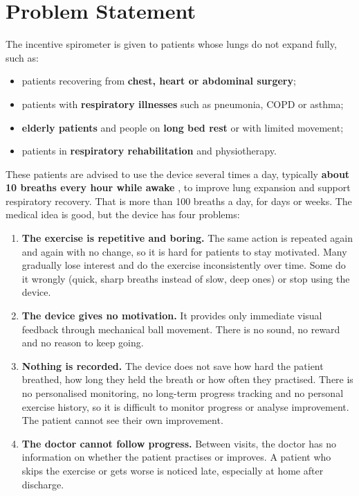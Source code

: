 \documentclass[12pt,a4paper]{article}
\begin{document}
\section{Problem Statement}
\label{sec:problem}

The incentive spirometer is given to patients whose lungs do not expand fully, such as:
\begin{itemize}
  \item patients recovering from \textbf{chest, heart or abdominal surgery};
  \item patients with \textbf{respiratory illnesses} such as pneumonia, COPD or asthma;
  \item \textbf{elderly patients} and people on \textbf{long bed rest} or with limited movement;
  \item patients in \textbf{respiratory rehabilitation} and physiotherapy.
\end{itemize}
These patients are advised to use the device several times a day, typically \textbf{about 10 breaths every hour while awake} \cite{cleveland}, to improve lung expansion and support respiratory recovery. That is more than 100 breaths a day, for days or weeks. The medical idea is good, but the device has four problems:

\begin{enumerate}
  \item \textbf{The exercise is repetitive and boring.} The same action is repeated again and again with no change, so it is hard for patients to stay motivated. Many gradually lose interest and do the exercise inconsistently over time. Some do it wrongly (quick, sharp breaths instead of slow, deep ones) or stop using the device.
  \item \textbf{The device gives no motivation.} It provides only immediate visual feedback through mechanical ball movement. There is no sound, no reward and no reason to keep going.
  \item \textbf{Nothing is recorded.} The device does not save how hard the patient breathed, how long they held the breath or how often they practised. There is no personalised monitoring, no long-term progress tracking and no personal exercise history, so it is difficult to monitor progress or analyse improvement. The patient cannot see their own improvement.
  \item \textbf{The doctor cannot follow progress.} Between visits, the doctor has no information on whether the patient practises or improves. A patient who skips the exercise or gets worse is noticed late, especially at home after discharge.
\end{enumerate}
\end{document}

